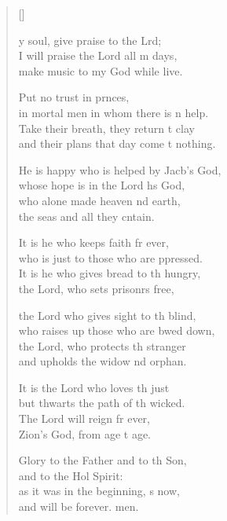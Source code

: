 \settowidth{\versewidth}{He is happy who is helped by Jacob’s God, *}
\begin{verse}[\versewidth]
  \begin{patverse}
y soul, give praise to the Lrd;\Flex\\
I will praise the Lord all m days,\Med\\
make music to my God while  live.

Put no trust in pr\pointup{\i}nces,\Med\\
in mortal men in whom there is n help.\\
Take their breath, they return t clay\Med\\
and their plans that day come t nothing.

He is happy who is helped by Jacb’s God,\Med\\
whose hope is in the Lord h\pointup{\i}s God,\\
who alone made heaven nd earth,\Med\\
the seas and all they cntain.

It is he who keeps faith fr ever,\Med\\
who is just to those who are ppressed.\\
It is he who gives bread to th hungry,\Med\\
the Lord, who sets prisonrs free,

the Lord who gives sight to th blind,\Med\\
who raises up those who are bwed down,\\
the Lord, who protects th stranger\Med\\
and upholds the widow nd orphan.

It is the Lord who loves th just\Med\\
but thwarts the path of th wicked.\\
The Lord will reign fr ever,\Med\\
Zion’s God, from age t age.

Glory to the Father and to th Son,\Med\\
and to the Hol Spirit:\\
as it was in the beginning, \pointup{\i}s now,\Med\\
and will be forever. men. 
  \end{patverse}
\end{verse}
